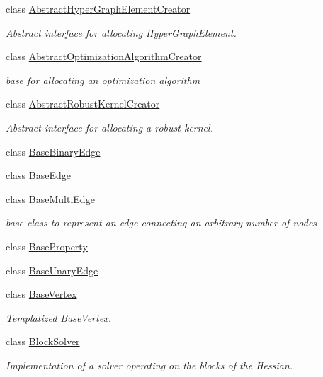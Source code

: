 \begin{DoxyCompactItemize}
\item 
class \mbox{\hyperlink{classg2o_1_1_abstract_hyper_graph_element_creator}{Abstract\+Hyper\+Graph\+Element\+Creator}}
\begin{DoxyCompactList}\small\item\em Abstract interface for allocating Hyper\+Graph\+Element. \end{DoxyCompactList}\item 
class \mbox{\hyperlink{classg2o_1_1_abstract_optimization_algorithm_creator}{Abstract\+Optimization\+Algorithm\+Creator}}
\begin{DoxyCompactList}\small\item\em base for allocating an optimization algorithm \end{DoxyCompactList}\item 
class \mbox{\hyperlink{classg2o_1_1_abstract_robust_kernel_creator}{Abstract\+Robust\+Kernel\+Creator}}
\begin{DoxyCompactList}\small\item\em Abstract interface for allocating a robust kernel. \end{DoxyCompactList}\item 
class \mbox{\hyperlink{classg2o_1_1_base_binary_edge}{Base\+Binary\+Edge}}
\item 
class \mbox{\hyperlink{classg2o_1_1_base_edge}{Base\+Edge}}
\item 
class \mbox{\hyperlink{classg2o_1_1_base_multi_edge}{Base\+Multi\+Edge}}
\begin{DoxyCompactList}\small\item\em base class to represent an edge connecting an arbitrary number of nodes \end{DoxyCompactList}\item 
class \mbox{\hyperlink{classg2o_1_1_base_property}{Base\+Property}}
\item 
class \mbox{\hyperlink{classg2o_1_1_base_unary_edge}{Base\+Unary\+Edge}}
\item 
class \mbox{\hyperlink{classg2o_1_1_base_vertex}{Base\+Vertex}}
\begin{DoxyCompactList}\small\item\em Templatized \mbox{\hyperlink{classg2o_1_1_base_vertex}{Base\+Vertex}}. \end{DoxyCompactList}\item 
class \mbox{\hyperlink{classg2o_1_1_block_solver}{Block\+Solver}}
\begin{DoxyCompactList}\small\item\em Implementation of a solver operating on the blocks of the Hessian. \end{DoxyCompactList}\item 

\end{DoxyCompactItemize}
